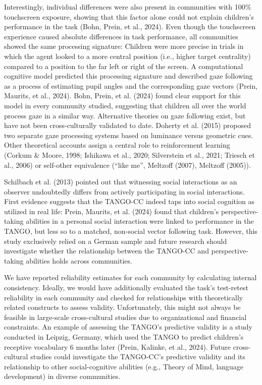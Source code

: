 \documentclass[
  man,floatsintext]{apa7}
\begin{document}
Interestingly, individual differences were also present in communities with 100\% touchscreen exposure, showing that this factor alone could not explain children's performance in the task (Bohn, Prein, et al., 2024).
Even though the touchscreen experience caused absolute differences in task performance, all communities showed the same processing signature: Children were more precise in trials in which the agent looked to a more central position (i.e., higher target centrality) compared to a position to the far left or right of the screen.
A computational cognitive model predicted this processing signature and described gaze following as a process of estimating pupil angles and the corresponding gaze vectors (Prein, Maurits, et al., 2024).
Bohn, Prein, et al. (2024) found clear support for this model in every community studied, suggesting that children all over the world process gaze in a similar way.
Alternative theories on gaze following exist, but have not been cross-culturally validated to date.
Doherty et al. (2015) proposed two separate gaze processing systems based on luminance versus geometric cues.
Other theoretical accounts assign a central role to reinforcement learning (Corkum \& Moore, 1998; Ishikawa et al., 2020; Silverstein et al., 2021; Triesch et al., 2006) or self-other equivalence (``like me'', Meltzoff (2007), Meltzoff (2005)).

Schilbach et al. (2013) pointed out that witnessing social interactions as an observer undoubtedly differs from actively participating in social interactions.
First evidence suggests that the TANGO-CC indeed taps into social cognition as utilized in real life: Prein, Maurits, et al. (2024) found that children's perspective-taking abilities in a personal social interaction were linked to performance in the TANGO, but less so to a matched, non-social vector following task.
However, this study exclusively relied on a German sample and future research should investigate whether the relationship between the TANGO-CC and perspective-taking abilities holds across communities.

We have reported reliability estimates for each community by calculating internal consistency.
Ideally, we would have additionally evaluated the task's test-retest reliability in each community and checked for relationships with theoretically related constructs to assess validity.
Unfortunately, this might not always be feasible in large-scale cross-cultural studies due to organizational and financial constraints.
An example of assessing the TANGO's predictive validity is a study conducted in Leipzig, Germany, which used the TANGO to predict children's receptive vocabulary 6 months later (Prein, Kalinke, et al., 2024).
Future cross-cultural studies could investigate the TANGO-CC's predictive validity and its relationship to other social-cognitive abilities (e.g., Theory of Mind, language development) in diverse communities.
\end{document}
